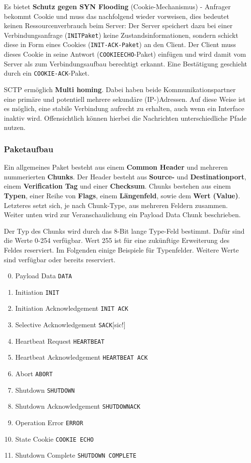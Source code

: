 \documentclass{article} %
\begin{document}
Es bietet \textbf{Schutz gegen SYN Flooding} (Cookie-Mechanismus) - Anfrager bekommt Cookie und muss das nachfolgend wieder vorweisen, dies bedeutet keinen Ressourcenverbrauch beim Server:
Der Server speichert dazu bei einer Verbindungsanfrage (\texttt{INITPaket}) keine Zustandsinformationen, sondern schickt diese in Form eines Cookies (\texttt{INIT-ACK-Paket}) an den Client.
Der Client muss dieses Cookie in seine Antwort (\texttt{COOKIEECHO}-Paket) einfügen und wird damit vom Server als zum Verbindungsaufbau berechtigt erkannt.
Eine Bestätigung geschieht durch ein \texttt{COOKIE-ACK}-Paket.

SCTP ermöglich \textbf{Multi homing}.
Dabei haben beide Kommunikationspartner eine primäre und potentiell mehrere sekundäre (IP-)Adressen.
Auf diese Weise ist es möglich, eine stabile Verbindung aufrecht zu erhalten, auch wenn ein Interface inaktiv wird.
Offensichtlich können hierbei die Nachrichten unterschiedliche Pfade nutzen.
\subsubsection{Paketaufbau}
Ein allgemeines Paket besteht aus einem \textbf{Common Header} und mehreren nummerierten \textbf{Chunks}.
Der Header besteht aus \textbf{Source-} und \textbf{Destinationport}, einem \textbf{Verification Tag} und einer \textbf{Checksum}.
Chunks bestehen aus einem \textbf{Typen}, einer Reihe von \textbf{Flags}, einem \textbf{Längenfeld}, sowie dem \textbf{Wert (Value)}.
Letzteres setzt sich, je nach Chunk-Type, aus mehreren Feldern zusammen.
Weiter unten wird zur Veranschaulichung ein Payload Data Chunk beschrieben.

Der Typ des Chunks wird durch das 8-Bit lange Type-Feld bestimmt.
Dafür sind die Werte 0-254 verfügbar.
Wert 255 ist für eine zukünftige Erweiterung des Feldes reserviert.
Im Folgenden einige Beispiele für Typenfelder.
Weitere Werte sind verfügbar oder bereits reserviert.
\begin{multicols}{2}
	\begin{enumerate}
		\setcounter{enumi}{-1}
		\item Payload Data \texttt{DATA}
		\item Initiation \texttt{INIT}
		\item Initiation Acknowledgement \texttt{INIT ACK}
		\item Selective Acknowledgement \texttt{SACK}[sic!]
		\item Heartbeat Request \texttt{HEARTBEAT}
		\item Heartbeat Acknowledgement \texttt{HEARTBEAT ACK}
		\item Abort \texttt{ABORT}
		\item Shutdown \texttt{SHUTDOWN}
		\item Shutdown Acknowledgement \texttt{SHUTDOWNACK}
		\item Operation Error \texttt{ERROR}
		\item State Cookie \texttt{COOKIE ECHO}
		\setcounter{enumi}{13}
		\item Shutdown Complete \texttt{SHUTDOWN COMPLETE}
	\end{enumerate}
\end{multicols}
\end{document}
